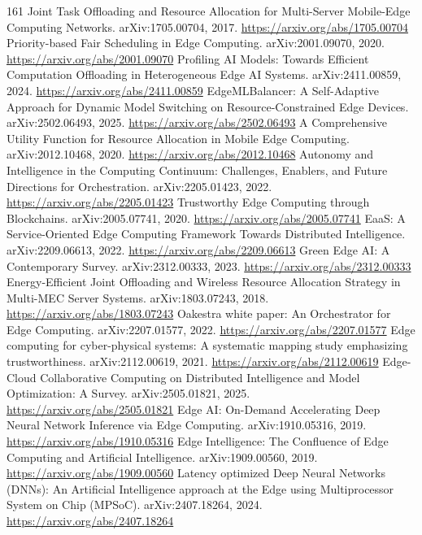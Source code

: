 \documentclass[11pt]{article}
\begin{document}
\begin{thebibliography}{161}
 Joint Task Offloading and Resource Allocation for Multi-Server Mobile-Edge Computing Networks. arXiv:1705.00704, 2017. \url{https://arxiv.org/abs/1705.00704}
 Priority-based Fair Scheduling in Edge Computing. arXiv:2001.09070, 2020. \url{https://arxiv.org/abs/2001.09070}
 Profiling AI Models: Towards Efficient Computation Offloading in Heterogeneous Edge AI Systems. arXiv:2411.00859, 2024. \url{https://arxiv.org/abs/2411.00859}
 EdgeMLBalancer: A Self-Adaptive Approach for Dynamic Model Switching on Resource-Constrained Edge Devices. arXiv:2502.06493, 2025. \url{https://arxiv.org/abs/2502.06493}
 A Comprehensive Utility Function for Resource Allocation in Mobile Edge Computing. arXiv:2012.10468, 2020. \url{https://arxiv.org/abs/2012.10468}
 Autonomy and Intelligence in the Computing Continuum: Challenges, Enablers, and Future Directions for Orchestration. arXiv:2205.01423, 2022. \url{https://arxiv.org/abs/2205.01423}
 Trustworthy Edge Computing through Blockchains. arXiv:2005.07741, 2020. \url{https://arxiv.org/abs/2005.07741}
 EaaS: A Service-Oriented Edge Computing Framework Towards Distributed Intelligence. arXiv:2209.06613, 2022. \url{https://arxiv.org/abs/2209.06613}
 Green Edge AI: A Contemporary Survey. arXiv:2312.00333, 2023. \url{https://arxiv.org/abs/2312.00333}
 Energy-Efficient Joint Offloading and Wireless Resource Allocation Strategy in Multi-MEC Server Systems. arXiv:1803.07243, 2018. \url{https://arxiv.org/abs/1803.07243}
 Oakestra white paper: An Orchestrator for Edge Computing. arXiv:2207.01577, 2022. \url{https://arxiv.org/abs/2207.01577}
 Edge computing for cyber-physical systems: A systematic mapping study emphasizing trustworthiness. arXiv:2112.00619, 2021. \url{https://arxiv.org/abs/2112.00619}
 Edge-Cloud Collaborative Computing on Distributed Intelligence and Model Optimization: A Survey. arXiv:2505.01821, 2025. \url{https://arxiv.org/abs/2505.01821}
 Edge AI: On-Demand Accelerating Deep Neural Network Inference via Edge Computing. arXiv:1910.05316, 2019. \url{https://arxiv.org/abs/1910.05316}
 Edge Intelligence: The Confluence of Edge Computing and Artificial Intelligence. arXiv:1909.00560, 2019. \url{https://arxiv.org/abs/1909.00560}
 Latency optimized Deep Neural Networks (DNNs): An Artificial Intelligence approach at the Edge using Multiprocessor System on Chip (MPSoC). arXiv:2407.18264, 2024. \url{https://arxiv.org/abs/2407.18264}

\end{thebibliography}
\end{document}
